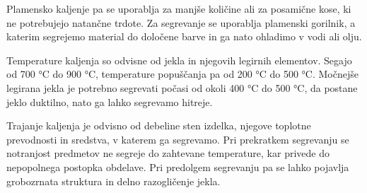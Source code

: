 Plamensko kaljenje pa se uporablja za manjše količine ali za
posamične kose, ki ne potrebujejo natančne trdote. Za
segrevanje se uporablja plamenski gorilnik, a katerim segrejemo
material do določene barve in ga nato ohladimo v vodi ali olju.

Temperature kaljenja so odvisne od jekla in njegovih legirnih
elementov. Segajo od 700 °C do 900 °C, temperature popuščanja
pa od 200 °C do 500 °C. Močnejše legirana jekla je potrebno
segrevati počasi od okoli 400 °C do 500 °C, da postane jeklo
duktilno, nato ga lahko segrevamo hitreje.

Trajanje kaljenja je odvisno od debeline sten izdelka, njegove toplotne
prevodnosti in sredstva, v katerem ga segrevamo. Pri prekratkem
segrevanju se notranjost predmetov ne segreje do zahtevane
temperature, kar privede do nepopolnega postopka obdelave. Pri
predolgem segrevanju pa se lahko pojavlja grobozrnata struktura
in delno razogličenje jekla.